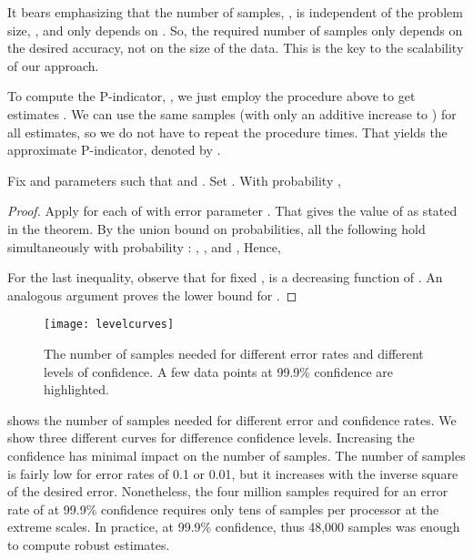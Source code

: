 \documentclass[final]{siamltex}
\newcommand{\pmetric}{P}
\begin{document}
It bears emphasizing that the number of  samples,  , is independent of  the problem size, , and only depends on .
So, the required number of samples  only depends on the desired accuracy, not on the size of the data. This is
the key to the scalability of our approach.

To compute the \pmetric-indicator, , we just employ the procedure
above to get estimates .
We can use the same samples (with only an additive increase to ) for all estimates, so we do not have to repeat the procedure  times.
That yields the approximate \pmetric-indicator, denoted by .

\begin{theorem} \label{thm:pmetric} Fix  and parameters 
such that  and . Set .
With probability , 

\end{theorem}

\begin{proof} Apply  for each of  with error parameter .
That gives the value of  as stated in the theorem. By the union bound on probabilities,
all the following hold simultaneously with probability :
,
, and
,
Hence,

For the last inequality, observe that for fixed ,  is a decreasing function of .
An analogous argument proves the lower bound for .
\end{proof}

\begin{figure}[thbp] 
   \centering
   \texttt{[image: levelcurves]} 
   \caption{ The number of samples needed for different error rates and
    different levels of confidence. A few data points at 99.9\%
    confidence are highlighted.}
   \label{fig:levelcurves}
\end{figure}

 shows the number of samples needed
for different error  and confidence rates. We show three different curves for
difference confidence levels. Increasing the confidence has minimal
impact on the number of samples. The number of samples is fairly low
for error rates of 0.1 or 0.01, but it increases with the inverse
square of the desired error. 
Nonetheless, the four million samples required for an error rate of  at 99.9\% confidence
requires only tens of samples per processor at the extreme scales.  In practice,  at 99.9\% confidence, thus 48,000  samples was enough to compute robust estimates. 
\end{document}
